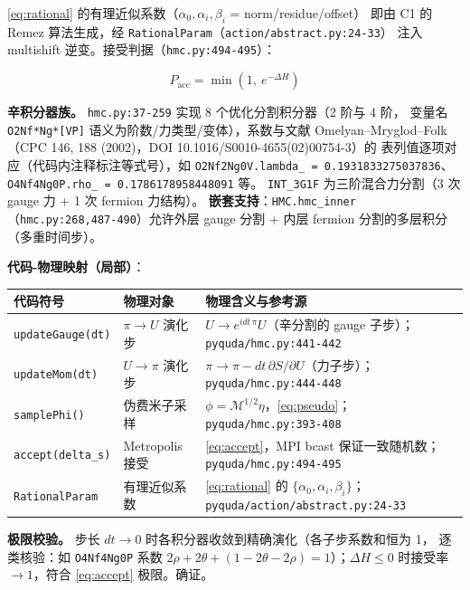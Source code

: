 \documentclass[UTF8]{ctexart}
\begin{document}
\eqref{eq:rational} 的有理近似系数（$\alpha_0,\alpha_i,\beta_i$ = norm/residue/offset）
即由 C1 的 Remez 算法生成，经 \texttt{RationalParam}（\texttt{action/abstract.py:24-33}）
注入 multishift 逆变。接受判据（\texttt{hmc.py:494-495}）：

\begin{equation}\label{eq:accept}
P_{\mathrm{acc}} = \min\left(1,\ e^{-\Delta H}\right)
\end{equation}

\textbf{辛积分器族。} \texttt{hmc.py:37-259} 实现 8 个优化分割积分器（2 阶与 4 阶，
变量名 \texttt{O2Nf*Ng*[VP]} 语义为阶数/力类型/变体），系数与文献
Omelyan--Mryglod--Folk（CPC 146, 188 (2002)，DOI 10.1016/S0010-4655(02)00754-3）的
表列值逐项对应（代码内注释标注等式号），如 \texttt{O2Nf2Ng0V.lambda\_ =
0.1931833275037836}、\texttt{O4Nf4Ng0P.rho\_ = 0.1786178958448091} 等。
\texttt{INT\_3G1F} 为三阶混合力分割（3 次 gauge 力 + 1 次 fermion 力结构）。
\textbf{嵌套支持}：\texttt{HMC.hmc\_inner}（\texttt{hmc.py:268,487-490}）允许外层
gauge 分割 + 内层 fermion 分割的多层积分（多重时间步）。

\textbf{代码-物理映射（局部）}：

\begin{xltabular}{\textwidth}{llX}
\toprule
\textcolor{map}{代码符号} & 物理对象 & 物理含义与参考源 \\
\midrule
\endhead
\texttt{updateGauge(dt)} & $\pi \to U$ 演化步 & $U \to e^{i dt\,\pi}U$（辛分割的 gauge 子步）；\texttt{\nolinkurl{pyquda/hmc.py:441-442}} \\
\texttt{updateMom(dt)} & $U \to \pi$ 演化步 & $\pi \to \pi - dt\,\partial S/\partial U$（力子步）；\texttt{\nolinkurl{pyquda/hmc.py:444-448}} \\
\texttt{samplePhi()} & 伪费米子采样 & $\phi = \mathcal{M}^{1/2}\eta$，\eqref{eq:pseudo}；\texttt{\nolinkurl{pyquda/hmc.py:393-408}} \\
\texttt{accept(delta\_s)} & Metropolis 接受 & \eqref{eq:accept}，MPI bcast 保证一致随机数；\texttt{\nolinkurl{pyquda/hmc.py:494-495}} \\
\texttt{RationalParam} & 有理近似系数 & \eqref{eq:rational} 的 $\{\alpha_0,\alpha_i,\beta_i\}$；\texttt{\nolinkurl{pyquda/action/abstract.py:24-33}} \\
\bottomrule
\end{xltabular}

\textbf{极限校验。} 步长 $dt\to 0$ 时各积分器收敛到精确演化（各子步系数和恒为 1，
逐类核验：如 \texttt{O4Nf4Ng0P} 系数 $2\rho+2\theta+(1-2\theta-2\rho)=1$）；$\Delta H \le 0$
时接受率 $\to 1$，符合 \eqref{eq:accept} 极限。\textcolor{accent}{确证}。
\end{document}
